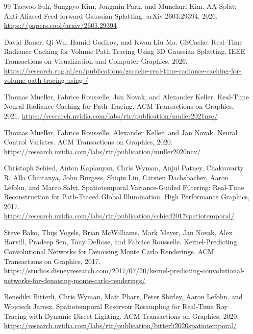 \documentclass[11pt]{article}
\begin{document}
\begin{thebibliography}{99}
Taewoo Suh, Sungpyo Kim, Jongmin Park, and Munchurl Kim.
\newblock AA-Splat: Anti-Aliased Feed-forward Gaussian Splatting.
\newblock arXiv:2603.29394, 2026.
\newblock \url{https://papers.cool/arxiv/2603.29394}

David Bauer, Qi Wu, Hamid Gadirov, and Kwan Liu Ma.
\newblock GSCache: Real-Time Radiance Caching for Volume Path Tracing Using
3D Gaussian Splatting.
\newblock IEEE Transactions on Visualization and Computer Graphics, 2026.
\newblock \url{https://research.rug.nl/en/publications/gscache-real-time-radiance-caching-for-volume-path-tracing-using-/}

Thomas Mueller, Fabrice Rousselle, Jan Novak, and Alexander Keller.
\newblock Real-Time Neural Radiance Caching for Path Tracing.
\newblock ACM Transactions on Graphics, 2021.
\newblock \url{https://research.nvidia.com/labs/rtr/publication/muller2021nrc/}

Thomas Mueller, Fabrice Rousselle, Alexander Keller, and Jan Novak.
\newblock Neural Control Variates.
\newblock ACM Transactions on Graphics, 2020.
\newblock \url{https://research.nvidia.com/labs/rtr/publication/muller2020ncv/}

Christoph Schied, Anton Kaplanyan, Chris Wyman, Anjul Patney,
Chakravarty R. Alla Chaitanya, John Burgess, Shiqiu Liu,
Carsten Dachsbacher, Aaron Lefohn, and Marco Salvi.
\newblock Spatiotemporal Variance-Guided Filtering: Real-Time Reconstruction
for Path-Traced Global Illumination.
\newblock High Performance Graphics, 2017.
\newblock \url{https://research.nvidia.com/labs/rtr/publication/schied2017spatiotemporal/}

Steve Bako, Thijs Vogels, Brian McWilliams, Mark Meyer, Jan Novak,
Alex Harvill, Pradeep Sen, Tony DeRose, and Fabrice Rousselle.
\newblock Kernel-Predicting Convolutional Networks for Denoising Monte Carlo
Renderings.
\newblock ACM Transactions on Graphics, 2017.
\newblock \url{https://studios.disneyresearch.com/2017/07/20/kernel-predicting-convolutional-networks-for-denoising-monte-carlo-renderings/}

Benedikt Bitterli, Chris Wyman, Matt Pharr, Peter Shirley, Aaron Lefohn,
and Wojciech Jarosz.
\newblock Spatiotemporal Reservoir Resampling for Real-Time Ray Tracing with
Dynamic Direct Lighting.
\newblock ACM Transactions on Graphics, 2020.
\newblock \url{https://research.nvidia.com/labs/rtr/publication/bitterli2020spatiotemporal/}


\end{thebibliography}
\end{document}
